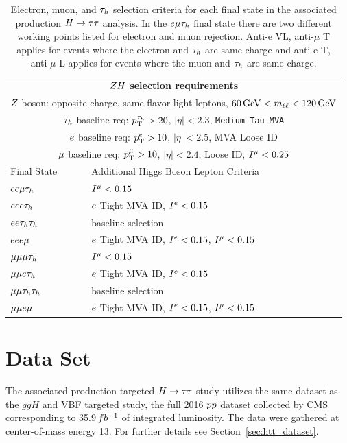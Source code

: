 \begin{table}[htbp]
\begin{small}
\begin{tabular}{ll}
\\
     \multicolumn{2}{c}{ \textbf{$ZH$ selection requirements} }                \\ 
     \multicolumn{2}{c}{$Z$ boson: opposite charge, same-flavor light leptons, $60\,\mathrm{GeV} < m_{\ell\ell} < 120\,\mathrm{GeV}$}  \\ 
     \multicolumn{2}{c}{$\tau_{h}$ baseline req: $p_\mathrm{T}^{\tau_{h}}>20$, $|\eta|<2.3$, \texttt{Medium Tau MVA}}   \\ 
     \multicolumn{2}{c}{$e$ baseline req: $p_\mathrm{T}^{e}>10$, $|\eta|<2.5$, MVA Loose ID }   \\ 
     \multicolumn{2}{c}{$\mu$ baseline req: $p_\mathrm{T}^{\mu}>10$, $|\eta|<2.4$, Loose ID, $I^{\mu}<0.25$ }   \\ 
\hline
  Final State           &        Additional Higgs Boson Lepton Criteria  \\
\hline
  $ee\mu\tau_{h}$     &   $I^{\mu}<0.15$       \\
  $eee\tau_{h}$      &   $e$ Tight MVA ID, $I^{e}<0.15$ \\
  $ee\tau_{h}\tau_{h}$    &   baseline selection       \\
  $eee\mu$       &   $e$ Tight MVA ID, $I^{e}<0.15$, $I^{\mu}<0.15$ \\
\hline
  $\mu\mu\mu\tau_{h}$   &   $I^{\mu}<0.15$       \\
  $\mu\mu e\tau_{h}$    &   $e$ Tight MVA ID, $I^{e}<0.15$ \\
  $\mu\mu\tau_{h}\tau_{h}$  &   baseline selection       \\
  $\mu\mu e\mu$     &   $e$ Tight MVA ID, $I^{e}<0.15$, $I^{\mu}<0.15$ \\
\hline
\end{tabular}
\end{small}
\caption{
Electron, muon, and $\tau_{h}$ selection criteria for each final state in the
associated production $H\to\tau\tau$ analysis. In the $e\mu\tau_{h}$ final state there
are two different working points listed for electron and muon rejection.
Anti-e VL, anti-$\mu$ T applies for events where the electron and $\tau_{h}$
are same charge and anti-e T, anti-$\mu$ L applies for events where the muon
and $\tau_{h}$ are same charge.
}
\label{tab:vh_inclusive_selection}
\end{table}



\section{Data Set}
\label{sec:vh_dataset}
The associated production targeted $H\to\tau\tau$ study utilizes the same dataset as the
$ggH$ and VBF targeted study, the full 2016 $pp$ 
dataset collected by CMS corresponding to 35.9$\,fb^{-1}$ 
of integrated luminosity. The data were gathered at center-of-mass energy 13\TeV.
For further details see Section~\ref{sec:htt_dataset}.



